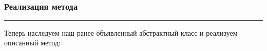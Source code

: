 \documentclass[a4paper, 14pt]{extarticle}
\begin{document}
\begin{center}
     \\
\end{center}

\subsubsection*{Реализация метода}\vspace{-20pt}\rule{\linewidth}{0.1mm}

Теперь наследуем наш ранее объявленный абстрактный класс и реализуем описанный 
метод:
\end{document}
